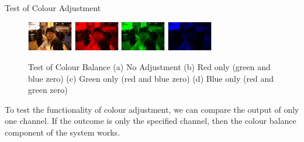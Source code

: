 \documentclass[final]{beamer}
\begin{document}
\begin{frame}{}
\begin{columns}[t]
\begin{column}{.48\linewidth}
        \begin{block}{Test of Colour Adjustment}
          \begin{figure}\label{colourbalancetest}
            \centering
            \subfigure
            {
                \includegraphics[width=75px]{colourtest_no_adjustment}
            }
            \subfigure
            {
                \includegraphics[width=75px]{colourtest_redonly}
            }
            \subfigure
            {
                \includegraphics[width=75px]{colourtest_greenonly}
            }
            \subfigure
            {
                \includegraphics[width=75px]{blueonly}
            }
            \caption{
                Test of Colour Balance 
                (a) No Adjustment
                (b) Red only (green and blue zero)
                (c) Green only (red and blue zero)
                (d) Blue only (red and green zero)
            }
         \end{figure}
         To test the functionality of colour adjustment, we can compare the output of only one channel.
         If the outcome is only the specified channel, then the colour balance component of the system works.
        \end{block}


\end{column}
\end{columns}
\end{frame}
\end{document}
